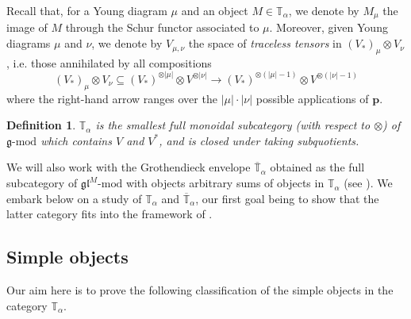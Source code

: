 \documentclass[11pt]{article}
\theoremstyle{plain}
\theoremstyle{nonumberplain}
\theoremstyle{plain}
\newtheorem{definition}[lemma]{Definition}
\theoremstyle{nonumberplain}
\newcommand\bT{\mathbb T}
\newcommand\fg{\mathfrak{g}}
\newcommand\fgl{\mathfrak{gl}}
\begin{document}
Recall that, for a Young diagram $\mu$ and an object
$M \in \bT_{\alpha}$, we denote by $M_\mu$ the image of $M$ through
the Schur functor associated to $\mu$. Moreover, given Young diagrams
$\mu$ and $\nu$, we denote by $V_{\mu,\nu}$ the space of {\it traceless
  tensors} in $(V_*)_\mu\otimes V_\nu$, i.e. those annihilated by all
compositions
\begin{equation*}
  (V_*)_\mu\otimes V_\nu \subseteq (V_*)^{\otimes |\mu|}\otimes V^{\otimes |\nu|} \to (V_*)^{\otimes (|\mu|-1)}\otimes V^{\otimes (|\nu|-1)}
\end{equation*}
where the right-hand arrow ranges over the $|\mu|\cdot|\nu|$
possible applications of $\mathbf{p}$.

\begin{definition}\label{def.t}
$\bT_\alpha$ is the smallest
full monoidal {subcategory (with respect to $\otimes$) of ${\fg\text{-mod}}$} which contains $V$ and
$V^*$, and is closed under taking subquotients.
\label{def.bTcat}
\end{definition}

We will also work with the Grothendieck envelope
$\overline{\bT}_\alpha$ obtained as the full subcategory of
${\fgl^M\text{-mod}}$ {with objects arbitrary sums} of objects in
$\bT_\alpha$ (see ). We embark below on a study of
$\bT_\alpha$ and $\overline{\bT}_\alpha$, our first goal being to
show that the latter category fits into the framework of
.










\subsection{Simple objects}\label{subse.simple}




Our aim here is to prove the following classification of the simple
objects in the category $\bT_\alpha$.
\end{document}
